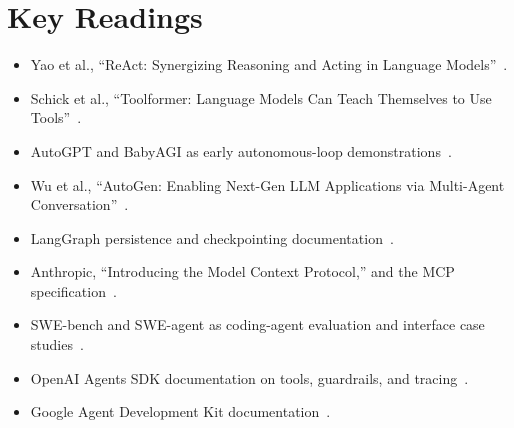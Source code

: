 \section*{Key Readings}

\begin{itemize}
  \item Yao et al., ``ReAct: Synergizing Reasoning and Acting in Language Models''~\cite{yao2023react}.
  \item Schick et al., ``Toolformer: Language Models Can Teach Themselves to Use Tools''~\cite{schick2023toolformer}.
  \item AutoGPT and BabyAGI as early autonomous-loop demonstrations~\cite{autogpt2023,babyagi2023}.
  \item Wu et al., ``AutoGen: Enabling Next-Gen LLM Applications via Multi-Agent Conversation''~\cite{wu2023autogen}.
  \item LangGraph persistence and checkpointing documentation~\cite{langgraph2026persistence}.
  \item Anthropic, ``Introducing the Model Context Protocol,'' and the MCP specification~\cite{anthropic2024mcp,mcp2026spec}.
  \item SWE-bench and SWE-agent as coding-agent evaluation and interface case studies~\cite{jimenez2024swebench,yang2024sweagent}.
  \item OpenAI Agents SDK documentation on tools, guardrails, and tracing~\cite{openai2025agents,openai2026agentssdkdocs}.
  \item Google Agent Development Kit documentation~\cite{google2026adk}.
\end{itemize}
